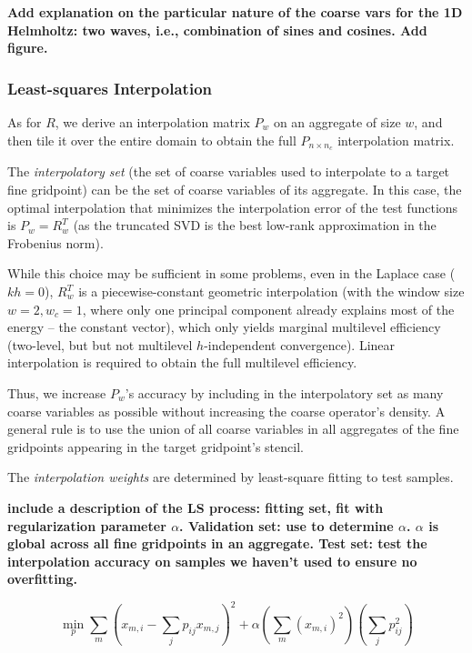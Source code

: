 \documentclass{article}
\begin{document}
{\bf Add explanation on the particular nature of the coarse vars for the 1D Helmholtz: two waves, i.e., combination of sines and cosines. Add figure.}

\subsubsection{Least-squares Interpolation}
As for $R$, we derive an interpolation matrix $P_w$ on an aggregate of size $w$, and then tile it over the entire domain to obtain the full $P_{n \times n_c}$ interpolation matrix.

The \emph{interpolatory set} (the set of coarse variables used to interpolate to a target fine gridpoint) can be the set of coarse variables of its aggregate. In this case, the optimal interpolation that minimizes the interpolation error of the test functions is $P_w = R_w^T$ (as the truncated SVD is the best low-rank approximation in the Frobenius norm).

While this choice may be sufficient in some problems, even in the Laplace case ($kh=0$), $R_w^T$ is a piecewise-constant geometric interpolation (with the window size $w = 2, w_c = 1$, where only one principal component already explains most of the energy -- the constant vector), which only yields marginal multilevel efficiency (two-level, but but not multilevel $h$-independent convergence). Linear interpolation is required to obtain the full multilevel efficiency.

Thus, we increase $P_w$'s accuracy by including in the interpolatory set as many coarse variables as possible without increasing the coarse operator's density. A general rule is to use the union of all coarse variables in all aggregates of the fine gridpoints appearing in the target gridpoint's stencil.

The \emph{interpolation weights} are determined by least-square fitting to test samples.

{\bf include a description of the LS process: fitting set, fit with regularization parameter $\alpha$. Validation set: use to determine $\alpha$. $\alpha$ is global across all fine gridpoints in an aggregate. Test set: test the interpolation accuracy on samples we haven't used to ensure no overfitting.
}

\begin{equation}
	\min_p \sum_m \left( x_{m,i} - \sum_j p_{ij} x_{m,j} \right)^2 + \alpha \left( \sum_m (x_{m,i})^2 \right) \left(\sum_j p_{ij}^2\right) 
\end{equation}
\end{document}
